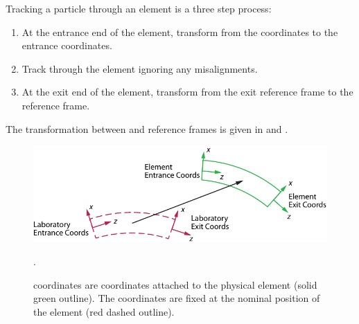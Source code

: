 Tracking a particle through an element is a three step process:
\begin{enumerate}
\item
At the entrance end of the element, transform from the  coordinates to the entrance
 coordinates.
\item
Track through the element ignoring any misalignments. 
\item
At the exit end of the element, transform from the exit  reference frame to the
 reference frame.
\end{enumerate}

The transformation between  and  reference frames is given in
 and .


\begin{figure}[tb]
  \centering
  \includegraphics[width=5in]{coord-offset.pdf}
  \caption[Element Coordinate System.]
  {
 coordinates are coordinates attached to the physical element (solid green outline). The
 coordinates are fixed at the nominal position of the element (red dashed outline).
  }
  \label{f:ele.coord}.
\end{figure}


